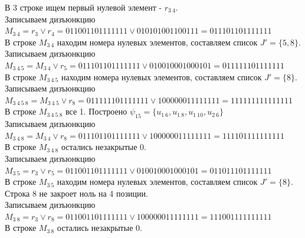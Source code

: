 \documentclass[a4paper,12pt]{article}
\begin{document}
\noindent
В 3 строке ищем первый нулевой элемент - $r_{3\ 4}$.\\
Записываем дизъюнкцию $M_{3\ 4} = r_{3}\lor r_{4} = 011001101111111 \lor 010101001100111 = 011101101111111$\\
В строке $M_{3\ 4}$ находим номера нулевых элементов, составляем список $J' = \{5, 8\}$.\\
Записываем дизъюнкцию $M_{3\ 4\ 5} = M_{3\ 4}\lor r_{5} = 011101101111111 \lor 010010001000101 = 011111101111111$\\
В строке $M_{3\ 4\ 5}$ находим номера нулевых элементов, составляем список $J' = \{8\}$.\\
Записываем дизъюнкцию $M_{3\ 4\ 5\ 8} = M_{3\ 4\ 5}\lor r_{8} = 011111101111111 \lor 100000011111111 = 111111111111111$\\
В строке $M_{3\ 4\ 5\ 8}$ все 1. Построено $\psi_{15} = \{u_{1\ 6},u_{1\ 8},u_{1\ 10},u_{2\ 6}\}$\\
Записываем дизъюнкцию $M_{3\ 4\ 8} = M_{3\ 4}\lor r_{8} = 011101101111111 \lor 100000011111111 = 111101111111111$\\
В строке $M_{3\ 4\ 8}$ остались незакрытые 0.\\
Записываем дизъюнкцию $M_{3\ 5} = r_{3}\lor r_{5} = 011001101111111 \lor 010010001000101 = 011011101111111$\\
В строке $M_{3\ 5}$ находим номера нулевых элементов, составляем список $J' = \{8\}$.\\
Строка 8 не закроет ноль на 4 позиции.\\
Записываем дизъюнкцию $M_{3\ 8} = r_{3}\lor r_{8} = 011001101111111 \lor 100000011111111 = 111001111111111$\\
В строке $M_{3\ 8}$ остались незакрытые 0.\\
\end{document}

